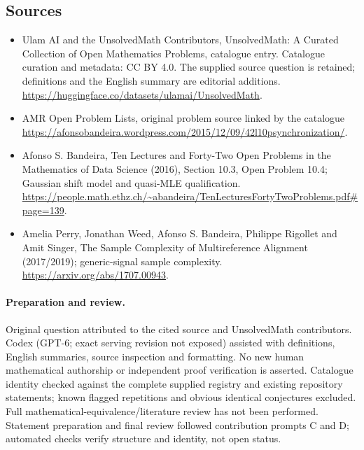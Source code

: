 \documentclass[11pt]{article}
\begin{document}
\subsection{Sources}
\begin{itemize}
\item[\hypertarget{source:statement:1}{S1}] Ulam AI and the UnsolvedMath Contributors, UnsolvedMath: A Curated Collection of Open Mathematics Problems, catalogue entry. Catalogue curation and metadata: CC BY 4.0. The supplied source question is retained; definitions and the English summary are editorial additions.
\url{https://huggingface.co/datasets/ulamai/UnsolvedMath}.
\item[\hypertarget{source:statement:2}{S2}] AMR Open Problem Lists, original problem source linked by the catalogue
\url{https://afonsobandeira.wordpress.com/2015/12/09/42l10psynchronization/}.
\item[\hypertarget{source:statement:3}{S3}] Afonso S. Bandeira, Ten Lectures and Forty-Two Open Problems in the Mathematics of Data Science (2016), Section 10.3, Open Problem 10.4; Gaussian shift model and quasi-MLE qualification.
\url{https://people.math.ethz.ch/~abandeira/TenLecturesFortyTwoProblems.pdf#page=139}.
\item[\hypertarget{source:statement:4}{S4}] Amelia Perry, Jonathan Weed, Afonso S. Bandeira, Philippe Rigollet and Amit Singer, The Sample Complexity of Multireference Alignment (2017/2019); generic-signal sample complexity.
\url{https://arxiv.org/abs/1707.00943}.
\end{itemize}
\paragraph{Preparation and review.}
Original question attributed to the cited source and UnsolvedMath contributors. Codex (GPT-6; exact serving revision not exposed) assisted with definitions, English summaries, source inspection and formatting. No new human mathematical authorship or independent proof verification is asserted. Catalogue identity checked against the complete supplied registry and existing repository statements; known flagged repetitions and obvious identical conjectures excluded. Full mathematical-equivalence/literature review has not been performed. Statement preparation and final review followed contribution prompts C and D; automated checks verify structure and identity, not open status.
\label{end:statement}
\end{document}
